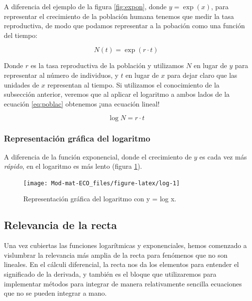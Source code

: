 \documentclass[
]{book}
\begin{document}
A diferencia del ejemplo de la figura \ref{fig:expon}, donde \(y = \exp(x)\), para representar el crecimiento de la población humana tenemos que medir la tasa reproductiva, de modo que podamos representar a la pobación como una función del tiempo:

\begin{equation}
N(t) = \exp(r \cdot t) \label{eq:poblac}
\end{equation}

Donde \(r\) es la tasa reproductiva de la población y utilizamos \(N\) en lugar de \(y\) para representar al número de individuos, y \(t\) en lugar de \(x\) para dejar claro que las unidades de \(x\) representan al tiempo. Si utilizamos el conocimiento de la subsección anterior, veremos que al aplicar el logaritmo a ambos lados de la ecuación \eqref{eq:poblac} obtenemos ¡una ecuación lineal!

\begin{equation}
    \log N = r \cdot t
\end{equation}

\hypertarget{representaciuxf3n-gruxe1fica-del-logaritmo}{%
\subsubsection{Representación gráfica del logaritmo}\label{representaciuxf3n-gruxe1fica-del-logaritmo}}

A diferencia de la función exponencial, donde el crecimiento de \(y\) es cada vez más \emph{rápido}, en el logaritmo es más lento (figura \ref{fig:log}).

\begin{figure}

{\centering \texttt{[image: Mod-mat-ECO\_files/figure-latex/log-1]} 

}

\caption{Representación gráfica del logaritmo con y = log x.}\label{fig:log}
\end{figure}

\hypertarget{relevancia-de-la-recta}{%
\subsection{Relevancia de la recta}\label{relevancia-de-la-recta}}

Una vez cubiertas las funciones logarítmicas y exponenciales, hemos comenzado a vislumbrar la relevancia más amplia de la recta para fenómenos que no son lineales. En el cálculi diferencial, la recta nos da los elementos para entender el significado de la derivada, y también es el bloque que utilizaremos para implementar métodos para integrar de manera relativamente sencilla ecuaciones que no se pueden integrar a mano.
\end{document}
